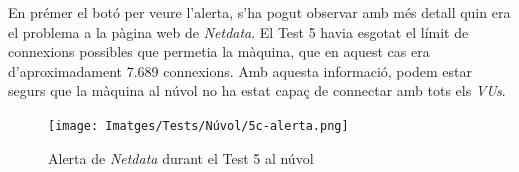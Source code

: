 En prémer el botó per veure l'alerta, s'ha pogut observar amb més detall quin era el problema a la pàgina web de \textit{Netdata}. El Test 5 havia esgotat el límit de connexions possibles que permetia la màquina, que en aquest cas era d'aproximadament 7.689 connexions. Amb aquesta informació, podem estar segurs que la màquina al núvol no ha estat capaç de connectar amb tots els \textit{VUs}.

\begin{figure}[!htbp] \texttt{[image: Imatges/Tests/Núvol/5c-alerta.png]}
\caption{Alerta de \textit{Netdata} durant el Test 5 al núvol} \end{figure}